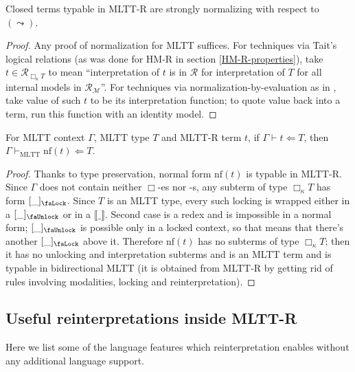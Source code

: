 \begin{theorem}
\label{mltt-r-sn}
    Closed terms typable in MLTT-R are strongly
    normalizing with respect to $(\leadsto)$.
\end{theorem}
\begin{proof}
    Any proof of normalization for MLTT suffices. For
    techniques via Tait's logical relations (as was done
    for HM-R in section \ref{HM-R-properties}), take
    $t\in\mathcal{R}_{\Box_\kappa T}$ to mean
    ``interpretation of $t$ is in $\mathcal{R}$ for
    interpretation of $T$ for all internal models in
    $\mathcal{R}_\mathcal{M}$''. For techniques via
    normalization-by-evaluation as in \cite{ABEL200717},
    take value of such $t$ to be its interpretation
    function; to quote value back into a term, run this
    function with an identity model.
\end{proof}

\begin{theorem}
    For MLTT context $\Gamma$, MLTT type $T$ and MLTT-R
    term $t$, if $\Gamma\vdash t\Leftarrow T$, then
    $\Gamma\vdash_\mathrm{MLTT}\mathrm{nf}(t)\Leftarrow
    T$.
\end{theorem}
\begin{proof}
    Thanks to type preservation, normal form
    $\mathrm{nf}(t)$ is typable in MLTT-R. Since
    $\Gamma$ does not contain neither $\Box$-es nor
    \faLock-s, any subterm of type $\Box_\kappa T$
    has form $[\_]_\text{\faLock}$. Since $T$ is an MLTT
    type, every such locking is wrapped either in a
    $[\_]_\text{\faUnlock}$ or in a $\llbracket\_
    \rrbracket$. Second case is a redex and is
    impossible in a normal form; $[\_]_\text{\faUnlock}$
    is possible only in a locked context, so that means
    that there's another $[\_]_\text{\faLock}$ above it.
    Therefore $\mathrm{nf}(t)$ has no subterms of type
    $\Box_\kappa T$; then it has no unlocking and
    interpretation subterms and is an MLTT term and is
    typable in bidirectional MLTT (it is obtained from
    MLTT-R by getting rid of rules involving modalities,
    locking and reinterpretation).
\end{proof}

\subsection{Useful reinterpretations inside MLTT-R}
\label{MLTT-R-applications}

Here we list some of the language features which
reinterpretation enables without any additional language
support.

